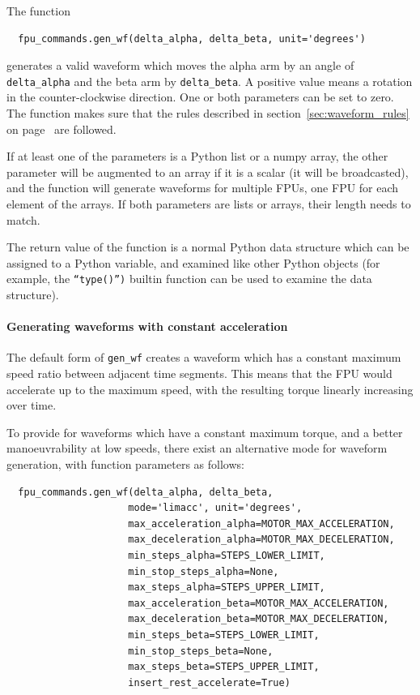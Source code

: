 \documentclass[fontsize=12,a4paper]{scrreprt}
\begin{document}
The function
\begin{verbatim}
  fpu_commands.gen_wf(delta_alpha, delta_beta, unit='degrees')
\end{verbatim}
generates a valid waveform which moves the alpha arm
by an angle of \texttt{delta\_alpha} and the beta arm by
\texttt{delta\_beta}. A positive value means a rotation in the
counter-clockwise direction.  One or both parameters can be set to
zero. The function makes sure that the rules described in
section~\ref{sec:waveform_rules} on page~\pageref{sec:waveform_rules}
are followed.

%
If at least one of the parameters is a Python list or a numpy array,
the other parameter will be augmented to an array if it is a scalar
(it will be broadcasted), and the function will generate waveforms for
multiple FPUs, one FPU for each element of the arrays. If both
parameters are lists or arrays, their length needs to match.

The return value of the function is a normal Python data structure
which can be assigned to a Python variable, and examined like other
Python objects (for example, the \texttt{``type()'')} builtin function
can be used to examine the data structure).

\paragraph{Generating waveforms with constant acceleration}
\label{sec:genwf:constant-acceleration}
The default form of \texttt{gen\_wf} creates a waveform which has
a constant maximum speed ratio between adjacent time segments.
This means that the FPU would accelerate up to the maximum speed,
with the resulting torque linearly increasing over time.

To provide for waveforms which have a constant maximum torque, and a
better manoeuvrability at low speeds, there exist an alternative mode
for waveform generation, with function parameters as follows:

\begin{verbatim}
  fpu_commands.gen_wf(delta_alpha, delta_beta,
                     mode='limacc', unit='degrees',
                     max_acceleration_alpha=MOTOR_MAX_ACCELERATION,
                     max_deceleration_alpha=MOTOR_MAX_DECELERATION,
                     min_steps_alpha=STEPS_LOWER_LIMIT,
                     min_stop_steps_alpha=None,
                     max_steps_alpha=STEPS_UPPER_LIMIT,
                     max_acceleration_beta=MOTOR_MAX_ACCELERATION,
                     max_deceleration_beta=MOTOR_MAX_DECELERATION,
                     min_steps_beta=STEPS_LOWER_LIMIT,
                     min_stop_steps_beta=None,
                     max_steps_beta=STEPS_UPPER_LIMIT,
                     insert_rest_accelerate=True)
\end{verbatim}
\end{document}
